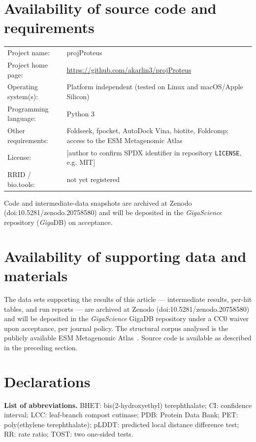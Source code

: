 \documentclass[10pt]{article}
\begin{document}
\section*{Availability of source code and requirements}
\noindent\begin{tabular}{@{}p{}p{}@{}}
Project name: & projProteus \\
Project home page: & \url{https://github.com/akarlin3/projProteus} \\
Operating system(s): & Platform independent (tested on Linux and macOS/Apple Silicon) \\
Programming language: & Python 3 \\
Other requirements: & Foldseek, fpocket, AutoDock Vina, biotite, Foldcomp; access to the ESM Metagenomic Atlas \\
License: & [author to confirm SPDX identifier in repository \texttt{LICENSE}, e.g. MIT] \\
RRID / bio.tools: & not yet registered \\
\end{tabular}

\noindent Code and intermediate-data snapshots are archived at Zenodo (doi:10.5281/zenodo.20758580) and will be deposited in the \emph{GigaScience} repository (\emph{Giga}DB) on acceptance.

\section*{Availability of supporting data and materials}
The data sets supporting the results of this article --- intermediate results, per-hit tables, and run reports --- are archived at Zenodo (doi:10.5281/zenodo.20758580) and will be deposited in the \emph{GigaScience} GigaDB repository under a CC0 waiver upon acceptance, per journal policy. The structural corpus analysed is the publicly available ESM Metagenomic Atlas~\cite{lin2023}. Source code is available as described in the preceding section.

\section*{Declarations}
\noindent\textbf{List of abbreviations.} BHET: bis(2-hydroxyethyl) terephthalate; CI: confidence interval; LCC: leaf-branch compost cutinase; PDB: Protein Data Bank; PET: poly(ethylene terephthalate); pLDDT: predicted local distance difference test; RR: rate ratio; TOST: two one-sided tests.
\end{document}
